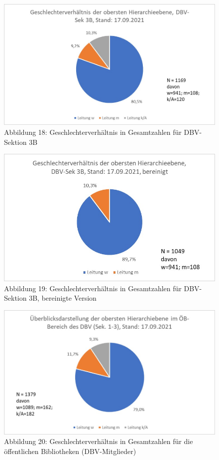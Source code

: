 \documentclass[a4paper,
fontsize=11pt,
oneside,
numbers=noperiodatend,
parskip=half-,
bibliography=totoc,
final
]{scrartcl}
\begin{document}
\begin{figure}
\centering
\includegraphics{img/Abb.18_DBV-Sek3B_gesamt.jpg}
\caption{Abbildung 18: Geschlechterverhältnis in Gesamtzahlen für
DBV-Sektion 3B}
\end{figure}

\begin{figure}
\centering
\includegraphics{img/Abb.19_DBV-Sek3B_gesamt_bereinigt.jpg}
\caption{Abbildung 19: Geschlechterverhältnis in Gesamtzahlen für
DBV-Sektion 3B, bereinigte Version}
\end{figure}

\begin{figure}
\centering
\includegraphics{img/Abb.20_DBV-Sek1-3_gesamt.jpg}
\caption{Abbildung 20: Geschlechterverhältnis in Gesamtzahlen für die
öffentlichen Bibliotheken (DBV-Mitglieder)}
\end{figure}
\end{document}
